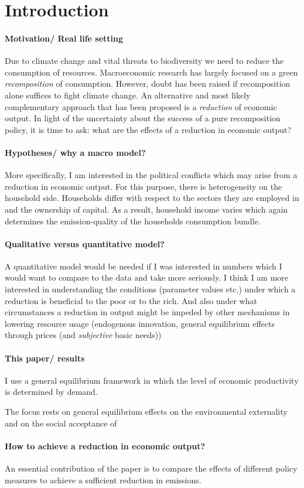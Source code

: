 \section{Introduction}

\paragraph{Motivation/ Real life setting}
Due to climate change and vital threats to biodiversity we need to reduce the consumption of resources. %
Macroeconomic research has largely focused on a green \textit{recomposition} of consumption. However, doubt has been raised if recomposition alone suffices to fight climate change. An alternative and most likely complementary approach that has been proposed is a \textit{reduction} of economic output. %
In light of the uncertainty about the success of a pure recomposition policy, it is time to ask: what are the effects of a reduction in economic output? 

\paragraph{Hypotheses/ why a macro model?}
More specifically, I am interested in the political conflicts which may arise from a reduction in economic output. For this purpose, there is heterogeneity on the household side. 
Households differ with respect to the sectors they are employed in and the ownership of capital. As a result, household income varies which again determines the emission-quality of the households consumption bundle.  


\paragraph{Qualitative versus quantitative model?}
A quantitative model would be needed if I was interested in numbers which I would want to compare to the data and take more seriously. 
I think I am more interested in understanding the conditions (parameter values etc.) under which a reduction is beneficial to the poor or to the rich. And also under what circumstances a reduction in output might be impeded by other mechanisms in lowering resource usage (endogenous innovation, general equilibrium effects through prices (and \textit{subjective} basic needs))


\paragraph{This paper/ results}
I use a general equilibrium framework in which the level of economic productivity is determined by demand. 

The focus rests on general equilibrium effects on the environmental externality and on the social acceptance of 


\paragraph{How to achieve a reduction in economic output?}
An essential contribution of the paper is to compare the effects of different policy measures to achieve a sufficient reduction in emissions. 